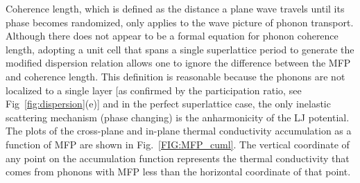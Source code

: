 \documentclass[aps,prb,preprint,preprintnumbers,amsmath,amssymb,floatfix,superscriptaddress]{revtex4}
\newcommand{\kv}{\mspace{-4.0mu}\left(\mspace{-8.0mu}
\begin{smallmatrix}&\pmb{\kappa} \\&\nu\end{smallmatrix}
\mspace{-3.0mu}\right)}
\begin{document}
Coherence length, which is defined as the distance a plane wave travels until its phase becomes randomized, only applies to the wave picture of phonon transport. Although there does not appear to be a formal equation for phonon coherence length,\cite{chen2005nanoscale} adopting a unit cell that spans a single superlattice period to generate the modified dispersion relation allows one to ignore the difference between the MFP and coherence length.\cite{PhysRevB.67.195311} This definition is reasonable because the phonons are not localized to a single layer [as confirmed by the participation ratio, see Fig~\ref{fig:dispersion}(e)] and in the perfect superlattice case, the only inelastic scattering mechanism (phase changing) is the anharmonicity of the LJ potential. The plots of the cross-plane and in-plane thermal conductivity accumulation as a function of MFP are shown in Fig.~\ref{FIG:MFP_cuml}. The vertical coordinate of any point on the accumulation function represents the thermal conductivity that comes from phonons with MFP less than the horizontal coordinate of that point.

\begin{comment}
The plots of the CP thermal conductivity MFP contribution curves, defined by
\begin{equation}\label{EQ:MFP_contr}
\begin{split}
dk_{\alpha}(\Lambda \kv)=c_{ph}\kv v^2_{g,\alpha}\kv \frac{\Lambda \kv} {|\pmb{\mathrm{v}}_{g}\kv|} d\Lambda \kv, 
\end{split}
\end{equation}
is shown in Fig.~\ref{FIG:MFP_cp}. 
\begin{figure}%
\begin{center}
\scalebox{1}{ \texttt{[image: MFP\_cp.eps]}}
\renewcommand{\figure}{Fig.}
\caption{Phonon mean free path normalized by the period length contribution to the cross-plane thermal conductivity. Color corresponds to those used in Fig.~\ref{FIG:lifetime}. Average MFP is reported. Orange corresponds to lighter bulk and green corresponds to heavier bulk.}
\label{FIG:MFP_cp}
\end{center}
\end{figure}
There is a clear reduction in the contribution to cross-plane thermal conductivity in perfect superlattices from modes with a MFP greater than the period length as period length increases. This trend is consistent with the theoretical predictions from Mahan that a minimum thermal conductivity occurs as the transport behaviour shifts from a wave-regime to particle-regime when the average MFP transitions from being greater than the period length to being less than the period length.\cite{PhysRevLett.84.927,PhysRevB.56.10754} This same trend is observed in the contribution curves for the in-plane conductivity (not shown). The minimum cross-plane thermal conductivity for perfect superlattices occurs at a point where the average MFP is greater than the period length ($4 \times 4$), as described by Mahan.\cite{PhysRevLett.84.927} 
\end{comment}
\end{document}
